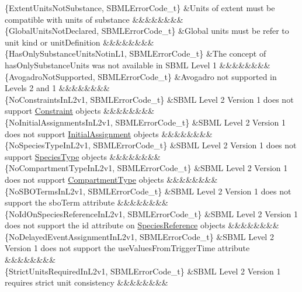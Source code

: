 \begin{DoxyParagraph}{}
\begin{longtabu}
\{Extent\+Units\+Not\+Substance, S\+B\+M\+L\+Error\+Code\+\_\+t\} &Units of extent must be compatible with units of substance &&&&&&&&\\
\{Global\+Units\+Not\+Declared, S\+B\+M\+L\+Error\+Code\+\_\+t\} &Global units must be refer to unit kind or unit\+Definition &&&&&&&&\\
\{Has\+Only\+Substance\+Units\+Notin\+L1, S\+B\+M\+L\+Error\+Code\+\_\+t\} &The concept of has\+Only\+Substance\+Units was not available in S\+B\+ML Level 1 &&&&&&&&\\
\{Avogadro\+Not\+Supported, S\+B\+M\+L\+Error\+Code\+\_\+t\} &Avogadro not supported in Levels 2 and 1 &&&&&&&&\\
\{No\+Constraints\+In\+L2v1, S\+B\+M\+L\+Error\+Code\+\_\+t\} &S\+B\+ML Level 2 Version 1 does not support \hyperlink{class_constraint}{Constraint} objects &&&&&&&&\\
\{No\+Initial\+Assignments\+In\+L2v1, S\+B\+M\+L\+Error\+Code\+\_\+t\} &S\+B\+ML Level 2 Version 1 does not support \hyperlink{class_initial_assignment}{Initial\+Assignment} objects &&&&&&&&\\
\{No\+Species\+Type\+In\+L2v1, S\+B\+M\+L\+Error\+Code\+\_\+t\} &S\+B\+ML Level 2 Version 1 does not support \hyperlink{class_species_type}{Species\+Type} objects &&&&&&&&\\
\{No\+Compartment\+Type\+In\+L2v1, S\+B\+M\+L\+Error\+Code\+\_\+t\} &S\+B\+ML Level 2 Version 1 does not support \hyperlink{class_compartment_type}{Compartment\+Type} objects &&&&&&&&\\
\{No\+S\+B\+O\+Terms\+In\+L2v1, S\+B\+M\+L\+Error\+Code\+\_\+t\} &S\+B\+ML Level 2 Version 1 does not support the \textquotesingle{}sbo\+Term\textquotesingle{} attribute &&&&&&&&\\
\{No\+Id\+On\+Species\+Reference\+In\+L2v1, S\+B\+M\+L\+Error\+Code\+\_\+t\} &S\+B\+ML Level 2 Version 1 does not support the \textquotesingle{}id\textquotesingle{} attribute on \hyperlink{class_species_reference}{Species\+Reference} objects &&&&&&&&\\
\{No\+Delayed\+Event\+Assignment\+In\+L2v1, S\+B\+M\+L\+Error\+Code\+\_\+t\} &S\+B\+ML Level 2 Version 1 does not support the \textquotesingle{}use\+Values\+From\+Trigger\+Time\textquotesingle{} attribute &&&&&&&&\\
\{Strict\+Units\+Required\+In\+L2v1, S\+B\+M\+L\+Error\+Code\+\_\+t\} &S\+B\+ML Level 2 Version 1 requires strict unit consistency &&&&&&&&\\

\end{longtabu}
\end{DoxyParagraph}
